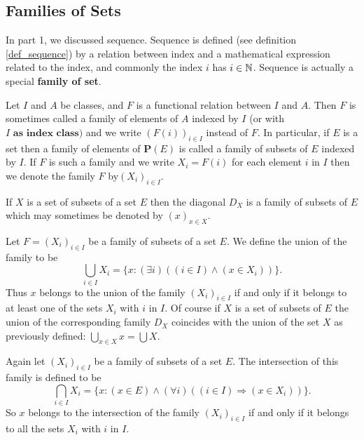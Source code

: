 \subsection{Families of Sets}
In part 1, we discussed sequence. Sequence is defined (see definition \ref{def_sequence}) by a relation between index and a mathematical expression related to the index, and commonly the index $i$ has $i\in \mathbb{N}$. Sequence is actually a special \textbf{family of set}.
\begin{definition}
	Let $I$ and $A$ be classes, and $F$ is a functional relation between $I$ and $A$. Then $F$ is sometimes called a family of elements of $A$ indexed by $I$ (or with $I\textbf{ as index class}) $ and we write $(F(i))_{i\in I}$ instead of $F$. In particular, if $E$ is a set then a family of elements of $\mathbf{P}(E)$ is called a family of subsets of $E$ indexed by $I.$ If $F$ is such a family and we write $X_i=F(i)$ for each element $i$ in $I$ then we denote the family $F$ by$\left ( X_i\right ) _{i\in I}.$
\end{definition} 
If $X$ is a set of subsets of a set $E$ then the diagonal $D_X$ is a family of subsets of $E$ which may sometimes be denoted by $(x)_{x\in X}.$

Let $F= ( X_{i}) _{i\in I}$ be a family of subsets of a set $E.$ We define the union of the family to be
$$
\bigcup_{i\in I}X_i=\{x:(\exists i)((i\in I)\land(x\in X_i))\}.
$$
Thus $x$ belongs to the union of the family $(X_i)_{i\in I}$ if and only if it belongs to at least one of the sets $X_i$ with $i$ in $I.$ Of course if $X$ is a set of subsets of $E$ the union of the corresponding family $D_X$ coincides with the union of the set $X$ as previously defined: $\bigcup_{x\in X}x=\bigcup X.$

Again let $(X_i)_{i\in I}$ be a family of subsets of a set $E.$ The intersection of this family is defined to be
$$
\bigcap_{i\in I}X_i=\{x:(x\in E)\land(\forall i)((i\in I)\Longrightarrow(x\in X_i))\}.
$$
So $x$ belongs to the intersection of the family $(X_i)_{i\in I}$ if and only if it belongs to all the sets $X_i$ with $i$ in $I.$

